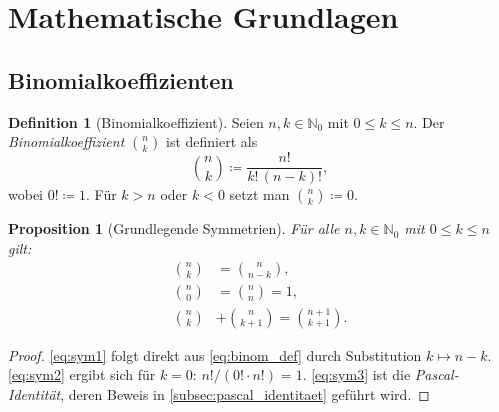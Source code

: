 ﻿\documentclass[12pt, a4paper]{article}
\newcommand{\myN}{\mathbb{N}}
\theoremstyle{plain}
\newtheorem{proposition}[theorem]{Proposition}
\theoremstyle{definition}
\newtheorem{definition}[theorem]{Definition}
\theoremstyle{remark}
\begin{document}
\section{Mathematische Grundlagen}
\label{sec:grundlagen}

\subsection{Binomialkoeffizienten}

\begin{definition}[Binomialkoeffizient]
  \label{def:binom}
  Seien $n, k \in \myN_0$ mit $0 \le k \le n$. Der
  \emph{Binomialkoeffizient} $\binom{n}{k}$ ist definiert als
  \begin{equation}
    \binom{n}{k} \coloneqq \frac{n!}{k!\,(n-k)!},
    \label{eq:binom_def}
  \end{equation}
  wobei $0! \coloneqq 1$. Für $k > n$ oder $k < 0$ setzt man
  $\binom{n}{k} \coloneqq 0$.
\end{definition}

\begin{proposition}[Grundlegende Symmetrien]
  \label{prop:symmetrie}
  Für alle $n, k \in \myN_0$ mit $0 \le k \le n$ gilt:
  \begin{align}
    \binom{n}{k} &= \binom{n}{n-k}, \label{eq:sym1}\\
    \binom{n}{0} &= \binom{n}{n} = 1, \label{eq:sym2}\\
    \binom{n}{k} &+ \binom{n}{k+1} = \binom{n+1}{k+1}. \label{eq:sym3}
  \end{align}
\end{proposition}

\begin{proof}
  \eqref{eq:sym1} folgt direkt aus \eqref{eq:binom_def} durch
  Substitution $k \mapsto n-k$. \eqref{eq:sym2} ergibt sich für
  $k = 0$: $n!/(0! \cdot n!) = 1$. \eqref{eq:sym3} ist die
  \emph{Pascal-Identität}, deren Beweis in
  \cref{subsec:pascal_identitaet} geführt wird.
\end{proof}
\end{document}
